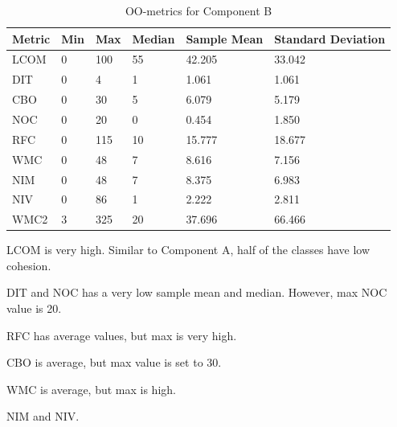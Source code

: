 \begin{table}[]
\centering
\caption{OO-metrics for Component B}
\label{tab:oometrics-blc}
\begin{tabular}{|l|l|l|l|l|l|}
\hline
\textbf{Metric} & \textbf{Min} & \textbf{Max} & \textbf{Median} & \textbf{Sample Mean} & \textbf{Standard Deviation} \\ \hline
LCOM            & 0            & 100          & 55              & 42.205               & 33.042                      \\ \hline
DIT             & 0            & 4            & 1               & 1.061                & 1.061                       \\ \hline
CBO             & 0            & 30           & 5               & 6.079                & 5.179                       \\ \hline
NOC             & 0            & 20           & 0               & 0.454                & 1.850                       \\ \hline
RFC             & 0            & 115          & 10              & 15.777               & 18.677                      \\ \hline
WMC             & 0            & 48           & 7               & 8.616                & 7.156                       \\ \hline
NIM             & 0            & 48           & 7               & 8.375                & 6.983                       \\ \hline
NIV             & 0            & 86           & 1               & 2.222                & 2.811                       \\ \hline
WMC2            & 3            & 325          & 20              & 37.696               & 66.466                      \\ \hline
\end{tabular}
\end{table}

LCOM is very high. Similar to Component A, half of the classes have low cohesion. 

DIT and NOC has a very low sample mean and median. However, max NOC value is 20.

RFC has average values, but max is very high. 

CBO is average, but max value is set to 30.

WMC is average, but max is high. 

NIM and NIV. 

